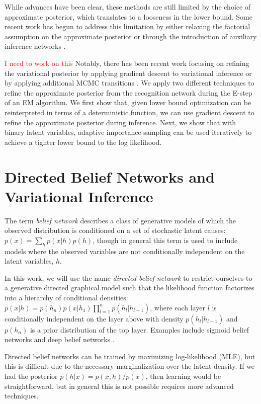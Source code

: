 \documentclass{article} %
\newcommand{\alert}[1]{\textcolor{red}{#1}}
\begin{document}
While advances have been clear, these methods are still limited by the choice
of approximate posterior, which translates to a looseness in the lower bound.
Some recent work has begun to address this limitation by either relaxing the
factorial assumption \citep{burda2015importance} on the approximate posterior or
through the introduction of auxiliary inference networks
\citep{rezende2015variational}. 

\alert{I need to work on this} Notably, there has been recent work focusing on
refining the variational posterior by applying gradient descent to variational
inference \citep{hoffman2013stochastic} or by applying additional MCMC
transitions \citep{salimans2014markov}. We apply two different techniques to
refine the approximate posterior from the recognition network during the E-step
of an EM algorithm. We first show that, given lower bound optimization can be
reinterpreted in terms of a deterministic function, we can use gradient descent
to refine the approximate posterior during inference. Next, we show that with
binary latent variables, adaptive importance sampling
\citep[AdIS][]{karamchandani1989adaptive} can be used iteratively to achieve a tighter
lower bound to the log likelihood.

\section{Directed Belief Networks and Variational Inference}

The term \emph{belief network} describes a class of generative models of which
the observed distribution is conditioned on a set of stochastic latent causes:
$p(x) = \sum_h p(x|h) p(h)$, though in general this term is used to include
models where the observed variables are not conditionally independent on the
latent variables, $h$. 

In this work, we will use the name \emph{directed belief network} to restrict
ourselves to a generative directed graphical model such that the likelihood
function factorizes into a hierarchy of conditional densities: $p(x | h) =
p(h_n) p(x|h_1) \prod_{l=1}^n p(h_{l}|h_{l+1})$, where each layer $l$ is
conditionally independent on the layer above with density $p(h_{l}|h_{l + 1})$
and $p(h_n)$ is a prior distribution of the top layer. Examples include sigmoid
belief networks \citep[SBN,][]{neal1992connectionist} and deep belief networks
\citep[DBN,][]{hinton2006fast}.

Directed belief networks can be trained by maximizing log-likelihood (MLE), but
this is difficult due to the necessary marginalization over the latent density.
If we had the posterior $p(h|x) = p(x, h) / p(x)$, then learning would be straightforward,
but in general this is not possible requires more advanced
techniques. 
\end{document}
